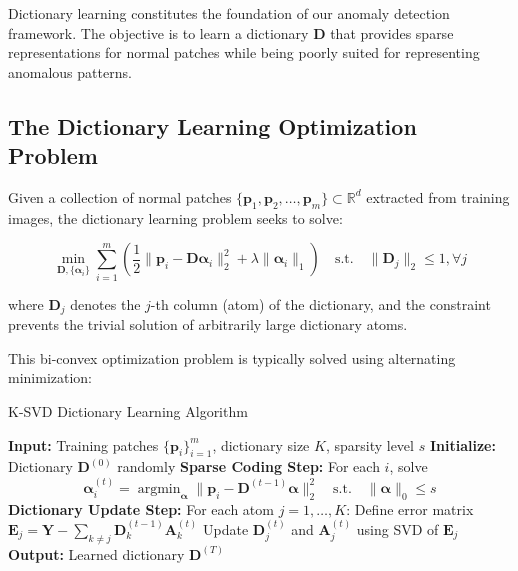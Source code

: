 \documentclass[12pt]{article}
\DeclareMathOperator{\argmin}{argmin}
\newcommand{\dictionary}{\mathbf{D}}
\newcommand{\patch}{\mathbf{p}}
\newcommand{\coeff}{\boldsymbol{\alpha}}
\begin{document}
Dictionary learning constitutes the foundation of our anomaly detection framework. The objective is to learn a dictionary $\dictionary$ that provides sparse representations for normal patches while being poorly suited for representing anomalous patterns.

\subsection{The Dictionary Learning Optimization Problem}
\label{subsec:dict_optimization}

Given a collection of normal patches $\{\patch_1, \patch_2, \ldots, \patch_m\} \subset \mathbb{R}^d$ extracted from training images, the dictionary learning problem seeks to solve:

\begin{equation}
    \label{eq:dict_learning_problem}
    \min_{\dictionary, \{\coeff_i\}} \sum_{i=1}^m \left(\frac{1}{2}\|\patch_i - \dictionary\coeff_i\|_2^2 + \lambda\|\coeff_i\|_1\right) \quad \text{s.t.} \quad \|\dictionary_j\|_2 \leq 1, \forall j
\end{equation}

where $\dictionary_j$ denotes the $j$-th column (atom) of the dictionary, and the constraint prevents the trivial solution of arbitrarily large dictionary atoms.

This bi-convex optimization problem is typically solved using alternating minimization:

\begin{algorithm}[H]
    \caption{K-SVD Dictionary Learning Algorithm}
    \label{alg:ksvd}
    \begin{algorithmic}[1]
        \STATE \textbf{Input:} Training patches $\{\patch_i\}_{i=1}^m$, dictionary size $K$, sparsity level $s$
        \STATE \textbf{Initialize:} Dictionary $\dictionary^{(0)}$ randomly
        \STATE \textbf{Sparse Coding Step:} For each $i$, solve
        \begin{equation*}
            \coeff_i^{(t)} = \argmin_{\coeff} \|\patch_i - \dictionary^{(t-1)}\coeff\|_2^2 \quad \text{s.t.} \quad \|\coeff\|_0 \leq s
        \end{equation*}
        \STATE \textbf{Dictionary Update Step:} For each atom $j = 1, \ldots, K$:
        \STATE \quad Define error matrix $\mathbf{E}_j = \mathbf{Y} - \sum_{k \neq j} \dictionary_k^{(t-1)} \mathbf{A}_k^{(t)}$
        \STATE \quad Update $\dictionary_j^{(t)}$ and $\mathbf{A}_j^{(t)}$ using SVD of $\mathbf{E}_j$
        \ENDFOR
        \STATE \textbf{Output:} Learned dictionary $\dictionary^{(T)}$
    \end{algorithmic}
\end{algorithm}
\end{document}
